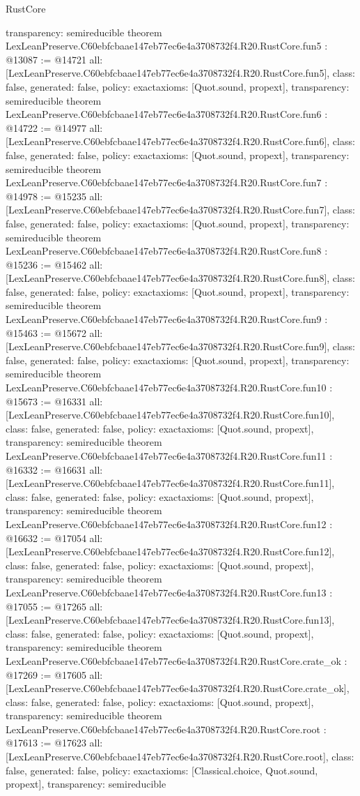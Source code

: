 \begin{lexlean}{RustCore}
\begin{coremodule}
{  transparency: semireducible
}
theorem LexLeanPreserve.C60ebfcbaae147eb77ec6e4a3708732f4.R20.RustCore.fun5 : @13087 := @14721 {
  all: [LexLeanPreserve.C60ebfcbaae147eb77ec6e4a3708732f4.R20.RustCore.fun5],
  class: false,
  generated: false,
  policy: exact{axioms: [Quot.sound, propext]},
  transparency: semireducible
}
theorem LexLeanPreserve.C60ebfcbaae147eb77ec6e4a3708732f4.R20.RustCore.fun6 : @14722 := @14977 {
  all: [LexLeanPreserve.C60ebfcbaae147eb77ec6e4a3708732f4.R20.RustCore.fun6],
  class: false,
  generated: false,
  policy: exact{axioms: [Quot.sound, propext]},
  transparency: semireducible
}
theorem LexLeanPreserve.C60ebfcbaae147eb77ec6e4a3708732f4.R20.RustCore.fun7 : @14978 := @15235 {
  all: [LexLeanPreserve.C60ebfcbaae147eb77ec6e4a3708732f4.R20.RustCore.fun7],
  class: false,
  generated: false,
  policy: exact{axioms: [Quot.sound, propext]},
  transparency: semireducible
}
theorem LexLeanPreserve.C60ebfcbaae147eb77ec6e4a3708732f4.R20.RustCore.fun8 : @15236 := @15462 {
  all: [LexLeanPreserve.C60ebfcbaae147eb77ec6e4a3708732f4.R20.RustCore.fun8],
  class: false,
  generated: false,
  policy: exact{axioms: [Quot.sound, propext]},
  transparency: semireducible
}
theorem LexLeanPreserve.C60ebfcbaae147eb77ec6e4a3708732f4.R20.RustCore.fun9 : @15463 := @15672 {
  all: [LexLeanPreserve.C60ebfcbaae147eb77ec6e4a3708732f4.R20.RustCore.fun9],
  class: false,
  generated: false,
  policy: exact{axioms: [Quot.sound, propext]},
  transparency: semireducible
}
theorem LexLeanPreserve.C60ebfcbaae147eb77ec6e4a3708732f4.R20.RustCore.fun10 : @15673 := @16331 {
  all: [LexLeanPreserve.C60ebfcbaae147eb77ec6e4a3708732f4.R20.RustCore.fun10],
  class: false,
  generated: false,
  policy: exact{axioms: [Quot.sound, propext]},
  transparency: semireducible
}
theorem LexLeanPreserve.C60ebfcbaae147eb77ec6e4a3708732f4.R20.RustCore.fun11 : @16332 := @16631 {
  all: [LexLeanPreserve.C60ebfcbaae147eb77ec6e4a3708732f4.R20.RustCore.fun11],
  class: false,
  generated: false,
  policy: exact{axioms: [Quot.sound, propext]},
  transparency: semireducible
}
theorem LexLeanPreserve.C60ebfcbaae147eb77ec6e4a3708732f4.R20.RustCore.fun12 : @16632 := @17054 {
  all: [LexLeanPreserve.C60ebfcbaae147eb77ec6e4a3708732f4.R20.RustCore.fun12],
  class: false,
  generated: false,
  policy: exact{axioms: [Quot.sound, propext]},
  transparency: semireducible
}
theorem LexLeanPreserve.C60ebfcbaae147eb77ec6e4a3708732f4.R20.RustCore.fun13 : @17055 := @17265 {
  all: [LexLeanPreserve.C60ebfcbaae147eb77ec6e4a3708732f4.R20.RustCore.fun13],
  class: false,
  generated: false,
  policy: exact{axioms: [Quot.sound, propext]},
  transparency: semireducible
}
theorem LexLeanPreserve.C60ebfcbaae147eb77ec6e4a3708732f4.R20.RustCore.crate_ok : @17269 := @17605 {
  all: [LexLeanPreserve.C60ebfcbaae147eb77ec6e4a3708732f4.R20.RustCore.crate_ok],
  class: false,
  generated: false,
  policy: exact{axioms: [Quot.sound, propext]},
  transparency: semireducible
}
theorem LexLeanPreserve.C60ebfcbaae147eb77ec6e4a3708732f4.R20.RustCore.root : @17613 := @17623 {
  all: [LexLeanPreserve.C60ebfcbaae147eb77ec6e4a3708732f4.R20.RustCore.root],
  class: false,
  generated: false,
  policy: exact{axioms: [Classical.choice, Quot.sound, propext]},
  transparency: semireducible
}


\end{coremodule}
\end{lexlean}
